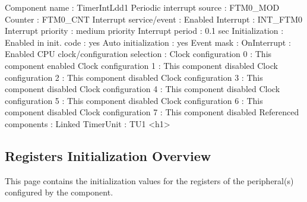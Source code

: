 \begin{DoxyCode}
            Component name                                 : TimerIntLdd1
            Periodic interrupt source                      : FTM0\_MOD
            Counter                                        : FTM0\_CNT
            Interrupt service/\textcolor{keyword}{event}                        : Enabled
              Interrupt                                    : INT\_FTM0
              Interrupt priority                           : medium priority
            Interrupt period                               : 0.1 sec
            Initialization                                 : 
              Enabled in init. code                        : yes
              Auto initialization                          : yes
              Event mask                                   : 
                OnInterrupt                                : Enabled
            CPU clock/configuration selection              : 
              Clock configuration 0                        : This component enabled
              Clock configuration 1                        : This component disabled
              Clock configuration 2                        : This component disabled
              Clock configuration 3                        : This component disabled
              Clock configuration 4                        : This component disabled
              Clock configuration 5                        : This component disabled
              Clock configuration 6                        : This component disabled
              Clock configuration 7                        : This component disabled
            Referenced components                          : 
              Linked TimerUnit                             : TU1
<h1>
\end{DoxyCode}
 \hypertarget{TimerIntLdd1_regs_overview}{}\subsection{Registers Initialization Overview}\label{TimerIntLdd1_regs_overview}
This page contains the initialization values for the registers of the peripheral(s) configured by the component. \tabulinesep=1mm
